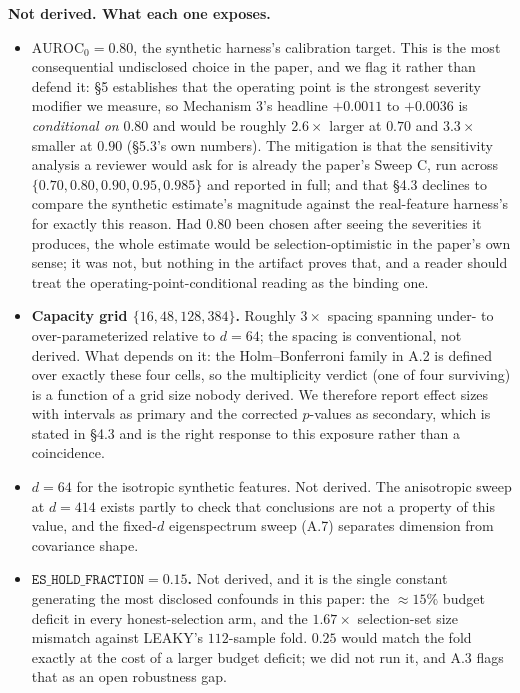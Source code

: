 \documentclass[10pt]{article} %
\begin{document}
\medskip\noindent\textbf{Not derived. What each one exposes.}
\begin{itemize}\itemsep2pt
\item \textbf{$\text{AUROC}_0 = 0.80$}, the synthetic harness's calibration
  target. This is the most consequential undisclosed choice in the paper, and
  we flag it rather than defend it: §5 establishes that the operating point is
  the strongest severity modifier we measure, so Mechanism 3's headline
  $+0.0011$ to $+0.0036$ is \emph{conditional on} $0.80$ and would be roughly
  $2.6\times$ larger at $0.70$ and $3.3\times$ smaller at $0.90$ (§5.3's own
  numbers). The mitigation is that the sensitivity analysis a reviewer would
  ask for is already the paper's Sweep C, run across
  $\{0.70,0.80,0.90,0.95,0.985\}$ and reported in full; and that §4.3 declines
  to compare the synthetic estimate's magnitude against the real-feature
  harness's for exactly this reason. Had $0.80$ been chosen after seeing the
  severities it produces, the whole estimate would be selection-optimistic in
  the paper's own sense; it was not, but nothing in the artifact proves that,
  and a reader should treat the operating-point-conditional reading as the
  binding one.
\item \textbf{Capacity grid $\{16,48,128,384\}$.} Roughly $3\times$ spacing
  spanning under- to over-parameterized relative to $d=64$; the spacing is
  conventional, not derived. What depends on it: the Holm--Bonferroni family in
  A.2 is defined over exactly these four cells, so the multiplicity verdict
  (one of four surviving) is a function of a grid size nobody derived. We
  therefore report effect sizes with intervals as primary and the corrected
  $p$-values as secondary, which is stated in §4.3 and is the right response to
  this exposure rather than a coincidence.
\item \textbf{$d=64$} for the isotropic synthetic features. Not derived. The
  anisotropic sweep at $d=414$ exists partly to check that conclusions are not
  a property of this value, and the fixed-$d$ eigenspectrum sweep (A.7)
  separates dimension from covariance shape.
\item \textbf{$\texttt{ES\_HOLD\_FRACTION}=0.15$.} Not derived, and it is the
  single constant generating the most disclosed confounds in this paper: the
  $\approx15\%$ budget deficit in every honest-selection arm, and the
  $1.67\times$ selection-set size mismatch against LEAKY's $112$-sample fold.
  $0.25$ would match the fold exactly at the cost of a larger budget deficit;
  we did not run it, and A.3 flags that as an open robustness gap.

\end{itemize}
\end{document}
